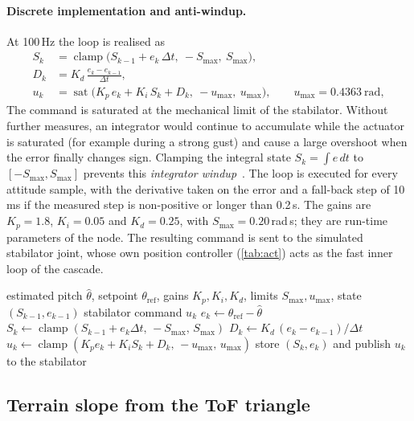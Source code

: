 \documentclass[11pt,a4paper]{article}
\begin{document}
\paragraph{Discrete implementation and anti-windup.} At 100\,Hz the loop is realised as
\begin{align}
S_k&=\operatorname{clamp}\bigl(S_{k-1}+e_k\,\Delta t,\ -S_{\max},\ S_{\max}\bigr),\\
D_k&=K_d\,\frac{e_k-e_{k-1}}{\Delta t},\\
u_k&=\operatorname{sat}\bigl(K_p\,e_k+K_i\,S_k+D_k,\ -u_{\max},\ u_{\max}\bigr),\qquad u_{\max}=0.4363\ \mathrm{rad},
\end{align}
The command is saturated at the mechanical limit of the stabilator. Without further measures, an integrator would continue to accumulate while the actuator is saturated (for example during a strong gust) and cause a large overshoot when the error finally changes sign. Clamping the integral state $S_k=\int e\,dt$ to $[-S_{\max},S_{\max}]$ prevents this \emph{integrator windup}~\cite{astrom}. The loop is executed for every attitude sample, with the derivative taken on the error and a fall-back step of 10\,ms if the measured step is non-positive or longer than 0.2\,s. The gains are $K_p=1.8$, $K_i=0.05$ and $K_d=0.25$, with $S_{\max}=0.20$\,rad\,s; they are run-time parameters of the node. The resulting command is sent to the simulated stabilator joint, whose own position controller (\cref{tab:act}) acts as the fast inner loop of the cascade.
 
\begin{algorithm}[ht]
\caption{Discrete PID pitch stabiliser with anti-windup (100\,Hz)}\label{alg:pid}
\begin{algorithmic}[1]
\Require estimated pitch $\hat\theta$, setpoint $\theta_{\mathrm{ref}}$, gains $K_p,K_i,K_d$, limits $S_{\max},u_{\max}$, state $(S_{k-1},e_{k-1})$
\Ensure stabilator command $u_k$
\State $e_k\gets\theta_{\mathrm{ref}}-\hat\theta$
\State $S_k\gets\operatorname{clamp}(S_{k-1}+e_k\Delta t,\,-S_{\max},\,S_{\max})$
\State $D_k\gets K_d\,(e_k-e_{k-1})/\Delta t$
\State $u_k\gets\operatorname{clamp}(K_p e_k+K_i S_k+D_k,\,-u_{\max},\,u_{\max})$
\State store $(S_k,e_k)$ and publish $u_k$ to the stabilator
\end{algorithmic}
\end{algorithm}
 
 
\subsection{Terrain slope from the ToF triangle}\label{sec:geometry}
\end{document}
